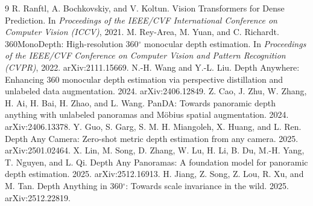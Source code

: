 \documentclass{article}
\begin{document}
\begin{thebibliography}{9}
\small
{} R. Ranftl, A. Bochkovskiy, and V. Koltun. Vision Transformers for Dense Prediction. In \emph{Proceedings of the IEEE/CVF International Conference on Computer Vision (ICCV)}, 2021.
 M. Rey-Area, M. Yuan, and C. Richardt. 360MonoDepth: High-resolution 360$^\circ$ monocular depth estimation. In \emph{Proceedings of the IEEE/CVF Conference on Computer Vision and Pattern Recognition (CVPR)}, 2022. arXiv:2111.15669.
 N.-H. Wang and Y.-L. Liu. Depth Anywhere: Enhancing 360 monocular depth estimation via perspective distillation and unlabeled data augmentation. 2024. arXiv:2406.12849.
 Z. Cao, J. Zhu, W. Zhang, H. Ai, H. Bai, H. Zhao, and L. Wang. PanDA: Towards panoramic depth anything with unlabeled panoramas and M\"obius spatial augmentation. 2024. arXiv:2406.13378.
 Y. Guo, S. Garg, S. M. H. Miangoleh, X. Huang, and L. Ren. Depth Any Camera: Zero-shot metric depth estimation from any camera. 2025. arXiv:2501.02464.
 X. Lin, M. Song, D. Zhang, W. Lu, H. Li, B. Du, M.-H. Yang, T. Nguyen, and L. Qi. Depth Any Panoramas: A foundation model for panoramic depth estimation. 2025. arXiv:2512.16913.
 H. Jiang, Z. Song, Z. Lou, R. Xu, and M. Tan. Depth Anything in 360$^\circ$: Towards scale invariance in the wild. 2025. arXiv:2512.22819.
\end{thebibliography}
\end{document}
